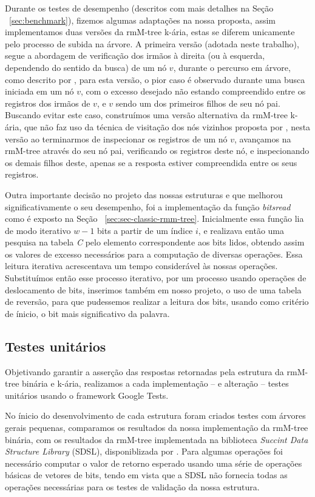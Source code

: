 Durante os testes de desempenho (descritos com mais detalhes na Seção ~\ref{sec:benchmark}), fizemos algumas adaptações na nossa proposta, assim implementamos duas versões da rmM-tree k-ária, estas se diferem unicamente pelo processo de subida na árvore. A primeira versão (adotada neste trabalho), segue a abordagem de verificação dos irmãos à direita  (ou à esquerda, dependendo do sentido da busca) de um nó $v$, durante o percurso em árvore, como descrito por \citet{book-compact-data-structures}, para esta versão, o pior caso é observado durante uma busca iniciada em um nó $v$, com o excesso desejado não estando compreendido entre os registros dos irmãos de $v$, e $v$ sendo um dos primeiros filhos de seu nó pai. Buscando evitar este caso, construímos uma versão alternativa da rmM-tree k-ária, que não faz uso da técnica de visitação dos nós vizinhos proposta por \citet{book-compact-data-structures}, nesta versão ao terminarmos de inspecionar os registros de um nó $v$, avançamos na rmM-tree através do seu nó pai, verificando os registros deste nó, e inspecionando os demais filhos deste, apenas se a resposta estiver compreendida entre os seus registros.   

Outra importante decisão no projeto das nossas estruturas e que melhorou significativamente o seu desempenho, foi a implementação da função \textit{bitsread} como é exposto na Seção ~\ref{sec:sec-classic-rmm-tree}. Inicialmente essa função lia de modo iterativo $w-1$ bits a partir de um índice $i$, e realizava então uma pesquisa na tabela \textit{C} pelo elemento correspondente aos bits lidos, obtendo assim os valores de excesso necessários para a computação de diversas operações. Essa leitura iterativa acrescentava um tempo considerável às nossas operações. Substituímos então esse processo iterativo, por um processo usando operações de deslocamento de bits, inserimos também em nosso projeto, o uso de uma tabela de reversão, para que pudessemos realizar a leitura dos bits, usando como critério de ínicio, o bit mais significativo da palavra.

\subsection{Testes unitários}
Objetivando garantir a asserção das respostas retornadas pela estrutura da rmM-tree binária e k-ária, realizamos a cada implementação -- e alteração  -- testes unitários usando o framework Google Tests.

No ínicio do desenvolvimento de cada estrutura foram criados testes com árvores gerais pequenas, comparamos os resultados da nossa implementação da rmM-tree binária, com os resultados da rmM-tree implementada na biblioteca \textit{Succint Data Structure Library} (SDSL), disponiblizada por \citet{sdsl-article}. Para algumas operações foi necessário computar o valor de retorno esperado usando uma série de operações básicas de vetores de bits, tendo em vista  que a SDSL não fornecia todas as operações necessárias para os testes de validação da nossa estrutura.

